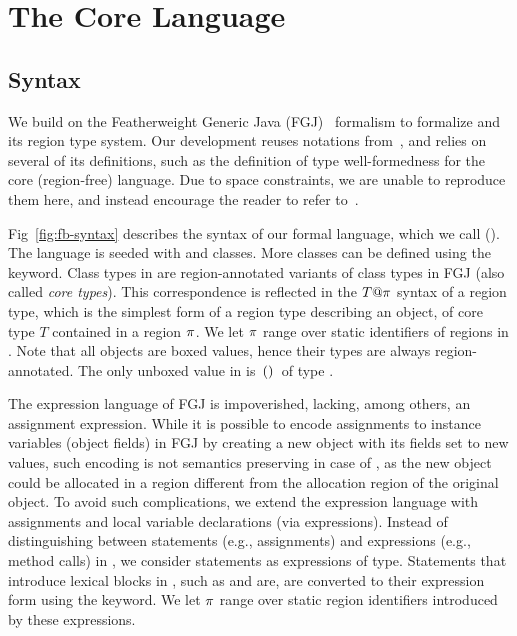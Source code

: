\section{The Core Language}
\label{sec:type-system}






\subsection{Syntax}
\label{sec:fb-syntax}

We build on the Featherweight Generic Java (FGJ)~\cite{fgj} formalism
to formalize \name and its region type system. Our development reuses
notations from~\cite{fgj}, and relies on several of its definitions,
such as the definition of type well-formedness for the core
(region-free) language. Due to space constraints, we are unable to
reproduce them here, and instead encourage the reader to refer
to~\cite{fgj}.

Fig~\ref{fig:fb-syntax} describes the syntax of our formal language,
which we call \fbname (\FB). The language is seeded with \ObjZ and
\RgnZ classes. More classes can be defined using the 
keyword. Class types in \FB are region-annotated variants of class
types in FGJ (also called \emph{core types}). This correspondence is
reflected in the $T@\pi$ syntax of a region type, which is the
simplest form of a region type describing an object, of core type $T$
contained in a region $\pi$. We let $\pi$ range over static
identifiers of regions in \FB. Note that all \FB objects are boxed
values, hence their \FB types are always region-annotated. The only
unboxed value in \FB is $\,{\tt ()}\,$ of type \unitZ.

The expression language of FGJ is impoverished, lacking, among others,
an assignment expression. While it is possible to encode
assignments to instance variables (object fields) in FGJ by creating a
new object with its fields set to new values, such encoding is not
semantics preserving in case of \name, as the new object could be
allocated in a region different from the allocation region of the
original object. To avoid such complications, we extend the expression
language with assignments and local variable declarations (via 
expressions). Instead of distinguishing between statements (e.g.,
assignments) and expressions (e.g., method calls) in \FB, we consider
statements as expressions of \unitZ type.  Statements that introduce
lexical blocks in \name, such as  and  are, are
converted to their expression form using the  keyword. We let
$\pi$ range over static region identifiers introduced by these
expressions.


